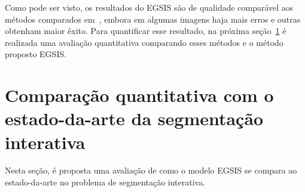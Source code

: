 \begin{figure}[h!]
        \captionsetup{width=11.5cm}
		\centering
\end{figure}
\FloatBarrier{}



Como pode ser visto, os resultados do \gls{EGSIS} são de qualidade
comparável aos métodos comparados em~\cite{wang2023review}, embora em
algumas imagens haja mais erros e outras obtenham maior êxito. Para
quantificar esse resultado, na próxima
seção~\ref{sec:comparacao-estado-da-arte} é realizada uma avaliação
quantitativa comparando esses métodos e o método proposto \gls{EGSIS}.


\section{Comparação quantitativa com o estado-da-arte da segmentação interativa}\label{sec:comparacao-estado-da-arte}

Nesta seção, é proposta uma avaliação de como o modelo \gls{EGSIS} se
compara ao estado-da-arte no problema de segmentação interativa.

